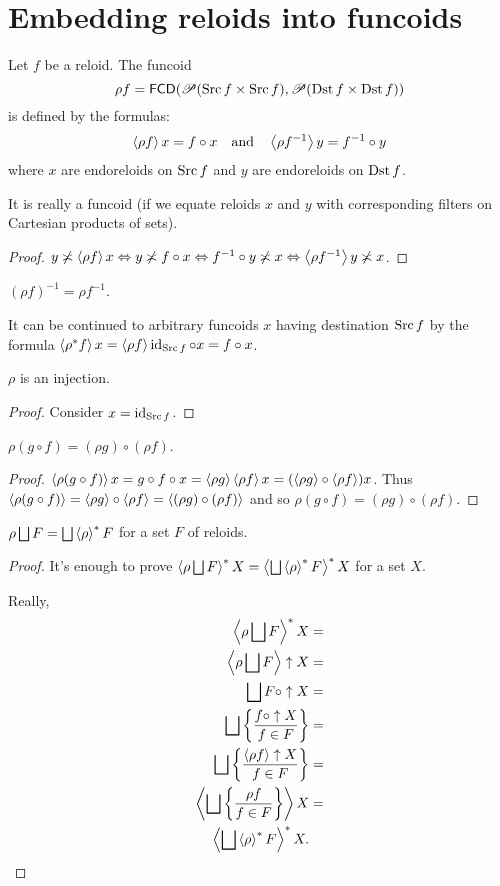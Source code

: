 \section{Embedding reloids into funcoids}
\begin{defn}
Let $f$ be a reloid. The funcoid
\[
\rho f=\mathsf{FCD}(\mathscr{P}(\operatorname{Src} f\times\operatorname{Src} f),\mathscr{P}(\operatorname{Dst} f\times\operatorname{Dst} f))
\]
is defined by the formulas:
\[
\left\langle \rho f\right\rangle x=f\circ x\quad\text{and}\quad\left\langle \rho f^{-1}\right\rangle y=f^{-1}\circ y
\]
where $x$ are endoreloids on $\operatorname{Src} f$ and $y$ are endoreloids on
$\operatorname{Dst} f$.\end{defn}
\begin{prop}
It is really a funcoid (if we equate reloids $x$ and $y$ with corresponding
filters on Cartesian products of sets).\end{prop}
\begin{proof}
$y\not\asymp\left\langle \rho f\right\rangle x\Leftrightarrow y\not\asymp f\circ x\Leftrightarrow f^{-1}\circ y\not\asymp x\Leftrightarrow\left\langle \rho f^{-1}\right\rangle y\not\asymp x$.\end{proof}
\begin{cor}
$(\rho f)^{-1}=\rho f^{-1}$.\end{cor}
\begin{defn}
It can be continued to arbitrary funcoids $x$ having destination
$\operatorname{Src} f$ by the formula $\left\langle \rho^{\ast}f\right\rangle x=\left\langle \rho f\right\rangle\operatorname{id}_{\operatorname{Src} f}\circ x=f\circ x$.\end{defn}
\begin{prop}
$\rho$ is an injection.\end{prop}
\begin{proof}
Consider $x=\operatorname{id}_{\operatorname{Src} f}$.\end{proof}
\begin{prop}
$\rho(g\circ f)=(\rho g)\circ(\rho f)$.\end{prop}
\begin{proof}
$\left\langle \rho(g\circ f)\right\rangle x=g\circ f\circ x=\left\langle \rho g\right\rangle\left\langle \rho f\right\rangle x=(\left\langle \rho g\right\rangle\circ\left\langle \rho f\right\rangle)x$.
Thus $\left\langle \rho(g\circ f)\right\rangle=\left\langle \rho g\right\rangle\circ\left\langle \rho f\right\rangle=\left\langle (\rho g)\circ(\rho f)\right\rangle$
and so $\rho(g\circ f)=(\rho g)\circ(\rho f)$.\end{proof}
\begin{thm}
$\rho\bigsqcup F=\bigsqcup\rsupfun{\rho}F$ for a set $F$ of reloids.\end{thm}
\begin{proof}
It's enough to prove $\rsupfun{\rho\bigsqcup F}X=\rsupfun{\bigsqcup\rsupfun{\rho}F}X$
for a set $X$.

Really,
\begin{align*}
\rsupfun{\rho\bigsqcup F}X & =\\
\supfun{\rho\bigsqcup F}\uparrow X & =\\
\bigsqcup F\circ\uparrow X & =\\
\bigsqcup\setcond{f\circ\uparrow X}{f\in F} & =\\
\bigsqcup\setcond{\supfun{\rho f}\uparrow X}{f\in F} & =\\
\supfun{\bigsqcup\setcond{\rho f}{f\in F}}X & =\\
\rsupfun{\bigsqcup\rsupfun{\rho}F}X.
\end{align*}
\end{proof}
